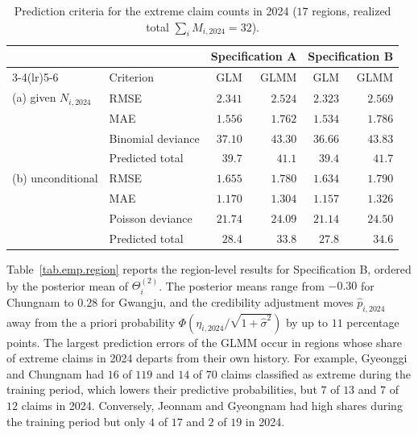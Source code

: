 \begin{table}[htbp]
\centering
\caption{Prediction criteria for the extreme claim counts in 2024
(\(17\) regions, realized total \(\sum_iM_{i,2024}=32\)).}
\label{tab.emp.crit}
\small
\begin{tabular}{llrrrr}
\toprule
& & \multicolumn{2}{c}{Specification A} & \multicolumn{2}{c}{Specification B}\\
\cmidrule(lr){3-4}\cmidrule(lr){5-6}
& Criterion & GLM & GLMM & GLM & GLMM\\
\midrule
(a) given \(N_{i,2024}\) & RMSE & \(2.341\) & \(2.524\) & \(2.323\) & \(2.569\)\\
& MAE & \(1.556\) & \(1.762\) & \(1.534\) & \(1.786\)\\
& Binomial deviance & \(37.10\) & \(43.30\) & \(36.66\) & \(43.83\)\\
& Predicted total & \(39.7\) & \(41.1\) & \(39.4\) & \(41.7\)\\
\midrule
(b) unconditional & RMSE & \(1.655\) & \(1.780\) & \(1.634\) & \(1.790\)\\
& MAE & \(1.170\) & \(1.304\) & \(1.157\) & \(1.326\)\\
& Poisson deviance & \(21.74\) & \(24.09\) & \(21.14\) & \(24.50\)\\
& Predicted total & \(28.4\) & \(33.8\) & \(27.8\) & \(34.6\)\\
\bottomrule
\end{tabular}
\end{table}

Table~\ref{tab.emp.region} reports the region-level results for
Specification B, ordered by the posterior mean of
\(\Theta_i^{(2)}\). The posterior means range from \(-0.30\) for
Chungnam to \(0.28\) for Gwangju, and the credibility adjustment moves
\(\widehat p_{i,2024}\) away from the a priori probability
\(\Phi\left(\eta_{i,2024}/\sqrt{1+\widehat\sigma^2}\right)\) by up to
\(11\) percentage points. The largest prediction errors of the GLMM
occur in regions whose share of extreme claims in 2024 departs from
their own history. For example, Gyeonggi and Chungnam had \(16\) of
\(119\) and \(14\) of \(70\) claims classified as extreme during the
training period, which lowers their predictive probabilities, but
\(7\) of \(13\) and \(7\) of \(12\) claims in 2024. Conversely, Jeonnam
and Gyeongnam had high shares during the training period but only
\(4\) of \(17\) and \(2\) of \(19\) in 2024.

